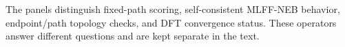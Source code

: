 The panels distinguish fixed-path scoring, self-consistent MLFF-NEB behavior, endpoint/path topology checks, and DFT convergence status. These operators answer different questions and are kept separate in the text.
